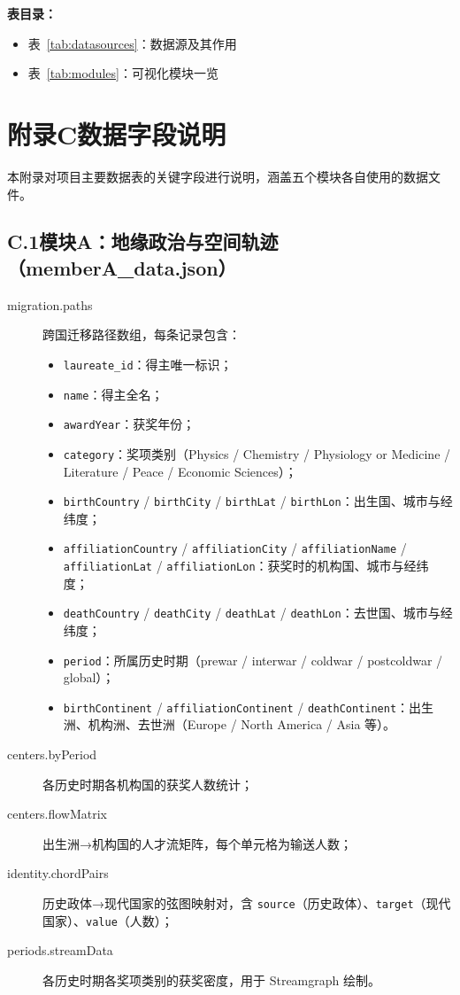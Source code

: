 \documentclass[UTF8]{CjC}
\theoremstyle{mystyle}
\begin{document}
{\noindent \textbf{表目录：}
\begin{itemize}
    \item 表~\ref{tab:datasources}：数据源及其作用
    \item 表~\ref{tab:modules}：可视化模块一览
\end{itemize}



\section*{附录C\quad 数据字段说明}

\noindent 本附录对项目主要数据表的关键字段进行说明，涵盖五个模块各自使用的数据文件。

\subsection*{C.1\quad 模块A：地缘政治与空间轨迹（memberA\_data.json）}
\begin{description}
    \item[migration.paths] 跨国迁移路径数组，每条记录包含：
    \begin{itemize}
        \item \texttt{laureate\_id}：得主唯一标识；
        \item \texttt{name}：得主全名；
        \item \texttt{awardYear}：获奖年份；
        \item \texttt{category}：奖项类别（Physics / Chemistry / Physiology or Medicine / Literature / Peace / Economic Sciences）；
        \item \texttt{birthCountry} / \texttt{birthCity} / \texttt{birthLat} / \texttt{birthLon}：出生国、城市与经纬度；
        \item \texttt{affiliationCountry} / \texttt{affiliationCity} / \texttt{affiliationName} / \texttt{affiliationLat} / \texttt{affiliationLon}：获奖时的机构国、城市与经纬度；
        \item \texttt{deathCountry} / \texttt{deathCity} / \texttt{deathLat} / \texttt{deathLon}：去世国、城市与经纬度；
        \item \texttt{period}：所属历史时期（prewar / interwar / coldwar / postcoldwar / global）；
        \item \texttt{birthContinent} / \texttt{affiliationContinent} / \texttt{deathContinent}：出生洲、机构洲、去世洲（Europe / North America / Asia 等）。
    \end{itemize}
    \item[centers.byPeriod] 各历史时期各机构国的获奖人数统计；
    \item[centers.flowMatrix] 出生洲→机构国的人才流矩阵，每个单元格为输送人数；
    \item[identity.chordPairs] 历史政体→现代国家的弦图映射对，含 \texttt{source}（历史政体）、\texttt{target}（现代国家）、\texttt{value}（人数）；
    \item[periods.streamData] 各历史时期各奖项类别的获奖密度，用于 Streamgraph 绘制。
\end{description}

}
\end{document}
